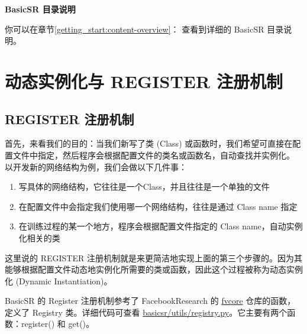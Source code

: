 \documentclass[../main.tex]{subfiles}
\begin{document}
\begin{note} %
    \textbf{BasicSR 目录说明}

    你可以在章节\ref{getting_start:content-overview}： 查看到详细的 BasicSR 目录说明。
\end{note}
\section{动态实例化与 REGISTER 注册机制}\label{code_structure:register}

\subsection{REGISTER 注册机制}\label{code_structure:register_intro}

首先，来看我们的目的：当我们新写了类 (Class) 或函数时，我们希望可直接在配置文件中指定，然后程序会根据配置文件的类名或函数名，自动查找并实例化。
以开发新的网络结构为例，我们会做以下几件事：
\begin{enumerate}
    \item 写具体的网络结构，它往往是一个Class，并且往往是一个单独的文件
    \item 在配置文件中会指定我们使用哪一个网络结构，往往是通过 Class name 指定
    \item 在训练过程的某一个地方，程序会根据配置文件指定的 Class name，自动实例化相关的类
\end{enumerate}

这里说的 REGISTER 注册机制就是来更简洁地实现上面的第三个步骤的。因为其能够根据配置文件动态地实例化所需要的类或函数，因此这个过程被称为动态实例化 (Dynamic Instantiation)。

BasicSR 的 Register 注册机制参考了 FacebookResearch 的 \href{https://github.com/facebookresearch/fvcore}{fvcore} 仓库的函数，定义了 Registry 类。详细代码可查看 \href{https://github.com/XPixelGroup/BasicSR/blob/master/basicsr/utils/registry.py}{basicsr/utils/registry.py}。它主要有两个函数：register() 和 get()。
\end{document}
